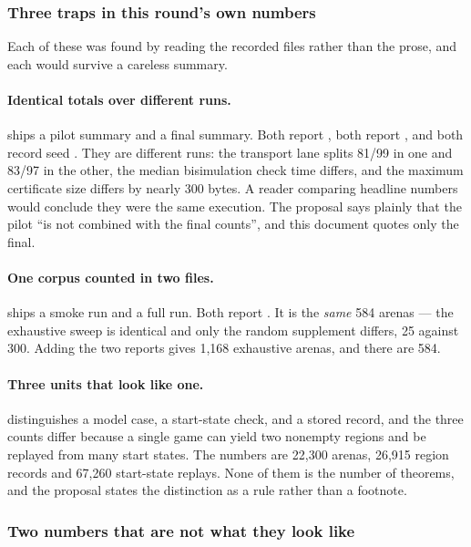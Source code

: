 \subsubsection*{Three traps in this round's own numbers}

Each of these was found by reading the recorded files rather than the prose,
and each would survive a careless summary.

\paragraph{Identical totals over different runs.}  ships a pilot
summary and a final summary. Both report , both report
, and both record seed . They are
different runs: the transport lane splits 81/99 in one and 83/97 in the other,
the median bisimulation check time differs, and the maximum certificate size
differs by nearly 300 bytes. A reader comparing headline numbers would conclude
they were the same execution. The proposal says plainly that the pilot ``is not
combined with the final counts'', and this document quotes only the final.

\paragraph{One corpus counted in two files.}  ships a smoke run and a
full run. Both report . It is the
\emph{same} 584 arenas --- the exhaustive sweep is identical and only the random
supplement differs, 25 against 300. Adding the two reports gives 1{,}168
exhaustive arenas, and there are 584.

\paragraph{Three units that look like one.}  distinguishes a model case,
a start-state check, and a stored record, and the three counts differ because a
single game can yield two nonempty regions and be replayed from many start
states. The numbers are 22{,}300 arenas, 26{,}915 region records and 67{,}260
start-state replays. None of them is the number of theorems, and the proposal
states the distinction as a rule rather than a footnote.

\subsubsection*{Two numbers that are not what they look like}

